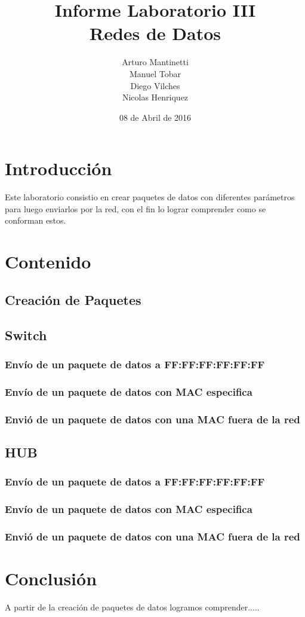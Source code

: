 \documentclass[spanish]{udpreport}
\title{Informe Laboratorio III \\ Redes de Datos}
\author{Arturo Mantinetti \\ Manuel Tobar \\ Diego Vilches \\ Nicolas Henriquez}
\date{08 de Abril de 2016}
\begin{document}
\maketitle

\tableofcontents

\chapter{Introducción}

Este laboratorio consistio en crear paquetes de datos con diferentes parámetros para luego enviarlos por la red, con el fin lo lograr comprender como se conforman estos.


\chapter{Contenido}

\section{Creación de Paquetes}

  
\section{Switch}

\subsection{Envío de un paquete de datos a FF:FF:FF:FF:FF:FF}

\subsection{Envío de un paquete de datos con MAC especifica}

\subsection{Envió de un paquete de datos con una MAC fuera de la red}

\section{HUB}

\subsection{Envío de un paquete de datos a FF:FF:FF:FF:FF:FF}

\subsection{Envío de un paquete de datos con MAC especifica}

\subsection{Envió de un paquete de datos con una MAC fuera de la red}


\chapter{Conclusión}

A partir de la creación de paquetes de datos logramos comprender.....
\end{document}
